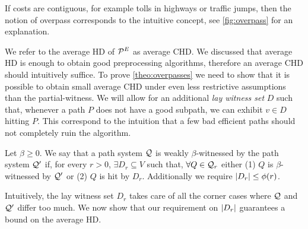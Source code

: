 If costs are contiguous, for example tolls in highways or traffic jumps, then the notion of overpass corresponds to the intuitive concept, see \cref{fig:overpass} for an explanation.

We refer to the average HD of $\mathcal{P}^E$ as average CHD.
We discussed that average HD is enough to obtain good preprocessing algorithms, therefore an average CHD should intuitively suffice.
To prove \cref{theo:overpasses} we  need to show that it is possible to obtain small average CHD under even less restrictive assumptions than the partial-witness.
We will allow for an additional \emph{lay witness set} $D$ such that, whenever a path $P$ does not have a good subpath, we can exhibit $v\in D$ hitting $P$.
This correspond to the intuition that a few bad efficient paths should not completely ruin the algorithm. 

\begin{definition}
Let $\beta\geq 0$.
We say that a path system  $\mathcal{Q}$ is weakly $\beta$-witnessed by the path system $\mathcal{Q}'$ if, for every $r>0$, $\exists D_r\subseteq V$ such that, $\forall Q\in \mathcal{Q}_r$ either (1) $Q$ is $\beta$-witnessed by $\mathcal{Q}'$ or (2) $Q$ is hit by $D_r$.
Additionally we require $\lvert D_r\rvert\leq \phi(r)$.
\end{definition} 

Intuitively, the lay witness set $D_r$ takes care of all the corner cases where $\mathcal{Q}$ and $\mathcal{Q}'$ differ too much.
We now show that our requirement on $\lvert D_r\rvert$ guarantees a bound on the average HD.

